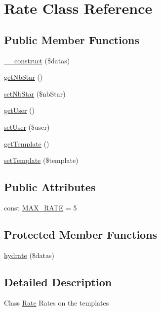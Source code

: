 \hypertarget{classRate}{}\section{Rate Class Reference}
\label{classRate}
\subsection*{Public Member Functions}
\begin{DoxyCompactItemize}
\item 
\hyperlink{classRate_a9c1d1659c4ea618cb6c7bcfa627511c2}{\+\_\+\+\_\+construct} (\$datas)
\item 
\hyperlink{classRate_a1259965577d0f575758f1a3de44c3d16}{get\+Nb\+Star} ()
\item 
\hyperlink{classRate_a2dca489df234440fe6961526da4ffa28}{set\+Nb\+Star} (\$nb\+Star)
\item 
\hyperlink{classRate_ad4bb3a3006c7249403767fea6b4e2857}{get\+User} ()
\item 
\hyperlink{classRate_ac00459ec3ec9bdb31e14f8dac2bfd4f3}{set\+User} (\$user)
\item 
\hyperlink{classRate_a14e1c35dec3924b5b64bc9ac5b620011}{get\+Template} ()
\item 
\hyperlink{classRate_a2c23b7f6a2649b7ffa7c3e9ac0a56652}{set\+Template} (\$template)
\end{DoxyCompactItemize}
\subsection*{Public Attributes}
\begin{DoxyCompactItemize}
\item 
const \hyperlink{classRate_a0ae96ec10958c4fa2da3d230449800bb}{M\+A\+X\+\_\+\+R\+A\+TE} = 5
\end{DoxyCompactItemize}
\subsection*{Protected Member Functions}
\begin{DoxyCompactItemize}
\item 
\hyperlink{classRate_aeb7dac18710f6782984b5007a5b4d3f5}{hydrate} (\$datas)
\end{DoxyCompactItemize}


\subsection{Detailed Description}
Class \hyperlink{classRate}{Rate} Rates on the templates 

